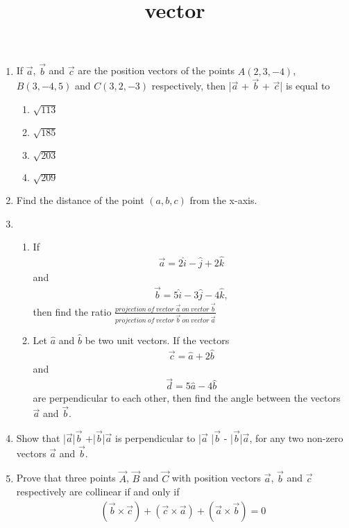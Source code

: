 \documentclass{article}
\title{vector}
\begin{document}
\begin{enumerate}
	\item If $\vec{a}$, $\vec{b}$ and $\vec{c}$ are the position vectors of the points $A(2,3,-4)$, $B(3,-4,5)$ and $C(3,2,-3)$ respectively, then |$\vec{a}$ + $\vec{b}$ + $\vec{c}$| is equal to
\begin{enumerate}[label=(\Alph*)]
\item $\sqrt{113}$
\item $\sqrt{185}$
\item $\sqrt{203}$
\item $\sqrt{209}$
\end{enumerate}
\item Find the distance of the point $(a, b, c)$ from the x-axis.
\item \begin{enumerate} %
		\item If 
			\begin{align}
				\vec{a}= 2\hat{i} - \hat{j} + 2\hat{k}
			\end{align}
			and
			\begin{align}
				\vec{b} = 5\hat{i} - 3\hat{j} - 4\hat{k},
			\end{align}
			then find the ratio
		$\frac{projection\:of\:vector\:\vec{a}\:on\:vector \:\vec{b}}{projection\:of\:vector\:\vec{b}\:on\:vector\:\vec{a}}$
\item Let $\hat{a}$ and $\hat{b}$ be two unit vectors. If the vectors 
	\begin{align}	
		\vec{c} = \hat{a} + 2\hat{b}
	\end{align}
		and 
		\begin{align}
			\vec{d} = 5\hat{a} - 4\hat{b} 
		\end{align}
		are perpendicular to each other, then find the angle between the vectors $\vec{a}$ and $\vec{b}.$ 
\end{enumerate}
\item Show that |$\vec{a}$|$\vec{b}$ +|$\vec{b}$|$\vec{a}$ is perpendicular to |$\vec{a}$ |$\vec{b}$ - |$\vec{b}$|$\vec{a}$, for any two non-zero vectors $\vec{a}$ and $\vec{b}.$
\item Prove that three points $\vec{A}$, $\vec{B}$ and $\vec{C}$ with position vectors $\vec{a}$, $\vec{b}$ and $\vec{c}$ respectively are collinear if and only if 
	\begin{align}
		(\vec{b} \times \vec{c}) + (\vec{c} \times \vec{a}) + (\vec{a} \times \vec{b}) = 0
	\end{align}
\end{enumerate}
\end{document}
